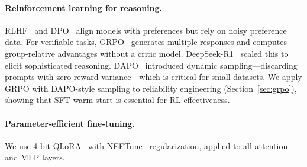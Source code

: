 \paragraph{Reinforcement learning for reasoning.}
RLHF~\cite{ouyang2022training} and DPO~\cite{rafailov2023dpo} align models with preferences but rely on noisy preference data. For verifiable tasks, GRPO~\cite{shao2024deepseekmath} generates multiple responses and computes group-relative advantages without a critic model. DeepSeek-R1~\cite{deepseek2025r1} scaled this to elicit sophisticated reasoning. DAPO~\cite{yu2025dapo} introduced dynamic sampling---discarding prompts with zero reward variance---which is critical for small datasets. We apply GRPO with DAPO-style sampling to reliability engineering (Section~\ref{sec:grpo}), showing that SFT warm-start is essential for RL effectiveness.

\paragraph{Parameter-efficient fine-tuning.}
We use 4-bit QLoRA~\cite{dettmers2023qlora,hu2022lora} with NEFTune~\cite{jain2023neftune} regularization, applied to all attention and MLP layers.
